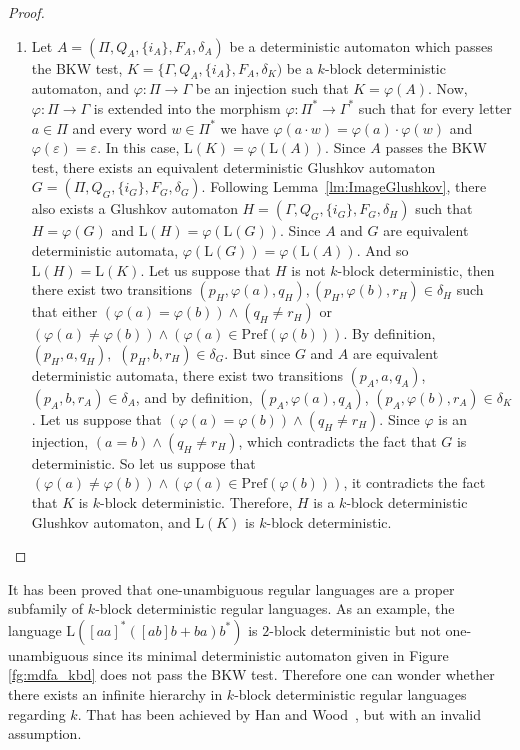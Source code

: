 \documentclass{llncs}
\begin{document}
\begin{proof}
\begin{enumerate}
	\item Let $A = (\Pi, Q_A, \{i_A\}, F_A, \delta_A)$ be a deterministic automaton which passes the BKW test, $K = \{\Gamma, Q_A, \{i_A\}, F_A, \delta_K)$ be a $k$-block deterministic automaton, and $\varphi : \Pi \rightarrow \Gamma$ be an injection such that $K = \varphi(A)$.
	Now, $\varphi : \Pi \rightarrow \Gamma$ is extended into the morphism $\varphi : \Pi^* \rightarrow \Gamma^*$ such that for every letter $a \in \Pi$ and every word $w \in \Pi^*$ we have $\varphi(a \cdot w) = \varphi(a) \cdot \varphi(w)$ and $\varphi(\varepsilon) = \varepsilon$.
	In this case, $\mathrm{L}(K) = \varphi(\mathrm{L}(A))$.
	Since $A$ passes the BKW test, there exists an equivalent deterministic Glushkov automaton $G = (\Pi, Q_G, \{i_G\}, F_G, \delta_G)$. Following Lemma~\ref{lm:ImageGlushkov}, there also exists a Glushkov automaton $H = (\Gamma, Q_G, \{i_G\}, F_G, \delta_H)$ such that $H = \varphi(G)$ and $\mathrm{L}(H) = \varphi(\mathrm{L}(G))$.
	Since $A$ and $G$ are equivalent deterministic automata,
	$\varphi(\mathrm{L}(G)) = \varphi(\mathrm{L}(A))$.
	And so $\mathrm{L}(H) = \mathrm{L}(K)$.
	Let us suppose that $H$ is not $k$-block deterministic, then there exist two transitions $(p_H, \varphi(a), q_H), (p_H, \varphi(b), r_H) \in \delta_H$ such that either $(\varphi(a) = \varphi(b)) \wedge (q_H \neq r_H)$ or $(\varphi(a) \neq \varphi(b)) \wedge (\varphi(a) \in \mathrm{Pref}(\varphi(b)))$.
	By definition, $(p_H, a, q_H),$ $(p_H, b, r_H) \in \delta_G$.
	But since $G$ and $A$ are equivalent deterministic automata, there exist two transitions $(p_A, a, q_A)$, $(p_A, b, r_A) \in \delta_A$, and by definition, $(p_A, \varphi(a), q_A)$, $(p_A, \varphi(b), r_A) \in \delta_K$.
	Let us suppose that $(\varphi(a) = \varphi(b)) \wedge (q_H \neq r_H)$.
	Since $\varphi$ is an injection, $(a = b) \wedge (q_H \neq r_H)$, which contradicts the fact that $G$ is deterministic.
	So let us suppose that $(\varphi(a) \neq \varphi(b)) \wedge (\varphi(a) \in \mathrm{Pref}(\varphi(b)))$, it contradicts the fact that $K$ is $k$-block deterministic.
	Therefore, $H$ is a $k$-block deterministic Glushkov automaton, and $\mathrm{L}(K)$ is $k$-block deterministic.
\end{enumerate}
\end{proof}

	It has been proved that one-unambiguous regular languages are a proper subfamily of $k$-block deterministic regular languages.
	As an example, the language $\mathrm{L}([aa]^*([ab]b + ba)b^*)$ is $2$-block deterministic but not one-unambiguous since its minimal deterministic automaton given in Figure \ref{fg:mdfa_kbd} does not pass the BKW test.
Therefore one can wonder whether there exists an infinite hierarchy in $k$-block deterministic regular languages regarding $k$.
That has been achieved by Han and Wood~\cite{HW08}, but with an invalid assumption.
\end{document}
